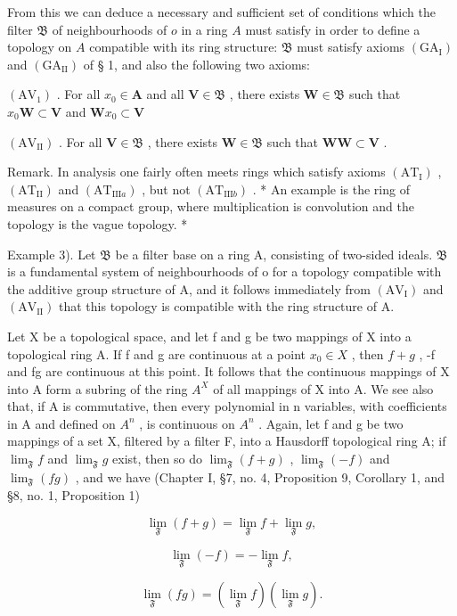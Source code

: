 From this we can deduce a necessary and sufficient set of conditions which the filter \(\mathfrak{B}\) of neighbourhoods of \(o\) in a ring \(A\) must satisfy in order to define a topology on \(A\) compatible with its ring structure: \(\mathfrak{B}\) must satisfy axioms \((\mathrm{GA}_{\mathrm{I}})\) and \((\mathrm{GA}_{\mathrm{II}})\) of § 1, and also the following two axioms:

\((\mathrm{AV}_{1})\) . For all \(x_0\in \mathbf{A}\) and all \(\mathbf{V}\in \mathfrak{B}\) , there exists \(\mathbf{W}\in \mathfrak{B}\) such that \(x_0\mathbf{W}\subset \mathbf{V}\) and \(\mathbf{W}x_0\subset \mathbf{V}\)

\((\mathrm{AV}_{\mathrm{II}})\) . For all \(\mathbf{V} \in \mathfrak{B}\) , there exists \(\mathbf{W} \in \mathfrak{B}\) such that \(\mathbf{WW} \subset \mathbf{V}\) .

Remark. In analysis one fairly often meets rings which satisfy axioms \((\mathrm{AT}_{\mathrm{I}})\) , \((\mathrm{AT}_{\mathrm{II}})\) and \((\mathrm{AT}_{\mathrm{III}a})\) , but not \((\mathrm{AT}_{\mathrm{III}b})\) . * An example is the ring of measures on a compact group, where multiplication is convolution and the topology is the vague topology. *

Example 3). Let \(\mathfrak{B}\) be a filter base on a ring A, consisting of two-sided ideals. \(\mathfrak{B}\) is a fundamental system of neighbourhoods of o for a topology compatible with the additive group structure of A, and it follows immediately from \((\mathrm{AV}_{\mathrm{I}})\) and \((\mathrm{AV}_{\mathrm{II}})\) that this topology is compatible with the ring structure of A.

Let X be a topological space, and let f and g be two mappings of X into a topological ring A. If f and g are continuous at a point \(x_{0} \in X\) , then \(f + g\) , -f and fg are continuous at this point. It follows that the continuous mappings of X into A form a subring of the ring \(A^{X}\) of all mappings of X into A. We see also that, if A is commutative, then every polynomial in n variables, with coefficients in A and defined on \(A^{n}\) , is continuous on \(A^{n}\) . Again, let f and g be two mappings of a set X, filtered by a filter F, into a Hausdorff topological ring A; if \(\lim_{\mathfrak{F}} f\) and \(\lim_{\mathfrak{F}} g\) exist, then so do \(\lim_{\mathfrak{F}} (f + g)\) , \(\lim_{\mathfrak{F}} (-f)\) and \(\lim_{\mathfrak{F}} (fg)\) , and we have (Chapter I, §7, no. 4, Proposition 9, Corollary 1, and §8, no. 1, Proposition 1)

\[
\lim _ {\mathfrak {F}} (f + g) = \lim _ {\mathfrak {F}} f + \lim _ {\mathfrak {F}} g,\tag{1}
\]

\[
\lim _ {\mathfrak {F}} (- f) = - \lim _ {\mathfrak {F}} f,\tag{2}
\]

\[
\lim _ {\mathfrak {F}} (f g) = (\lim _ {\mathfrak {F}} f) (\lim _ {\mathfrak {F}} g).\tag{3}
\]

